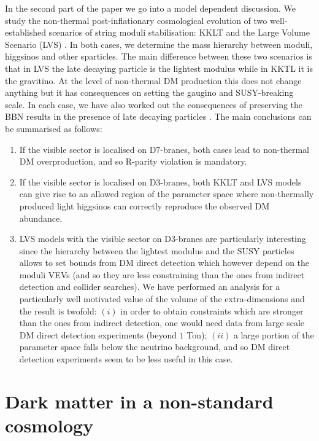 \documentclass[11pt,a4paper]{article}
\begin{document}
In the second part of the paper we go into a model dependent discussion. We study the non-thermal post-inflationary cosmological evolution of two well-established scenarios of string moduli stabilisation: KKLT \cite{Kachru:2003aw} and the Large Volume Scenario (LVS) \cite{Balasubramanian:2005zx}. In both cases, we determine the mass hierarchy between moduli, higgsinos and other sparticles. The main difference between these two scenarios is that in LVS the late decaying particle is the lightest modulus while in KKTL it is the gravitino. At the level of non-thermal DM production this does not change anything but it has consequences on setting the gaugino and SUSY-breaking scale. In each case, we have also worked out the consequences of preserving the BBN results in the presence of late decaying particles \cite{CMP}. The main conclusions can be summarised as follows:
\begin{enumerate}
\item If the visible sector is localised on D7-branes, both cases lead to non-thermal DM overproduction, and so R-parity violation is mandatory.

\item If the visible sector is localised on D3-branes, both KKLT and LVS models can give rise to an allowed region of the parameter space where non-thermally produced light higgsinos can correctly reproduce the observed DM abundance. 

\item LVS models with the visible sector on D3-branes are particularly interesting since the hierarchy between the lightest modulus and the SUSY particles allows to set bounds from DM direct detection which however depend on the moduli VEVs (and so they are less constraining than the ones from indirect detection and collider searches). We have performed an analysis for a particularly well motivated value of the volume of the extra-dimensions and the result is twofold: $(i)$ in order to obtain constraints which are stronger than the ones from indirect detection, one would need data from large scale DM direct detection experiments (beyond $1$ Ton); $(ii)$ a large portion of the parameter space falls below the neutrino background, and so DM direct detection experiments seem to be less useful in this case.
\end{enumerate}


\section{Dark matter in a non-standard cosmology}
\label{section2}
\end{document}
